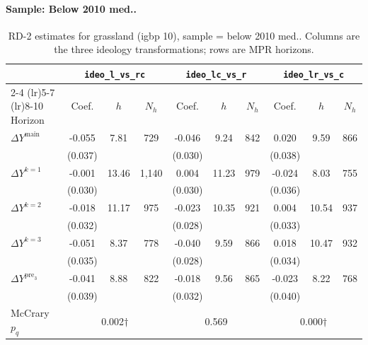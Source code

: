 \documentclass[11pt]{article}
\begin{document}
\paragraph{Sample: Below 2010 med..}
\begin{table}[H]
\centering
\scriptsize
\caption{RD-2 estimates for grassland (igbp 10), sample = below 2010 med..
Columns are the three ideology transformations; rows are MPR horizons.}
\label{tab:rd2_grassland_below}
\begin{tabular}{l ccc ccc ccc}
\toprule
 & \multicolumn{3}{c}{\texttt{ideo\_l\_vs\_rc}}
 & \multicolumn{3}{c}{\texttt{ideo\_lc\_vs\_r}}
 & \multicolumn{3}{c}{\texttt{ideo\_lr\_vs\_c}} \\
\cmidrule(lr){2-4} \cmidrule(lr){5-7} \cmidrule(lr){8-10}
Horizon & Coef. & $h$ & $N_h$ & Coef. & $h$ & $N_h$ & Coef. & $h$ & $N_h$ \\
\midrule
$\Delta Y^{\text{main}}$ & -0.055 & 7.81 & 729 & -0.046 & 9.24 & 842 & 0.020 & 9.59 & 866 \\
 & (0.037) &  &  & (0.030) &  &  & (0.038) &  &  \\
\addlinespace[1pt]
$\Delta Y^{k=1}$ & -0.001 & 13.46 & 1,140 & 0.004 & 11.23 & 979 & -0.024 & 8.03 & 755 \\
 & (0.030) &  &  & (0.030) &  &  & (0.036) &  &  \\
\addlinespace[1pt]
$\Delta Y^{k=2}$ & -0.018 & 11.17 & 975 & -0.023 & 10.35 & 921 & 0.004 & 10.54 & 937 \\
 & (0.032) &  &  & (0.028) &  &  & (0.033) &  &  \\
\addlinespace[1pt]
$\Delta Y^{k=3}$ & -0.051 & 8.37 & 778 & -0.040 & 9.59 & 866 & 0.018 & 10.47 & 932 \\
 & (0.035) &  &  & (0.028) &  &  & (0.034) &  &  \\
\addlinespace[1pt]
$\Delta Y^{\text{pre}_3}$ & -0.041 & 8.88 & 822 & -0.018 & 9.56 & 865 & -0.023 & 8.22 & 768 \\
 & (0.039) &  &  & (0.032) &  &  & (0.040) &  &  \\
\addlinespace[1pt]
\midrule
McCrary $p_q$ & \multicolumn{3}{c}{0.002$\dagger$} & \multicolumn{3}{c}{0.569} & \multicolumn{3}{c}{0.000$\dagger$} \\
\bottomrule
\end{tabular}
\end{table}
\end{document}
